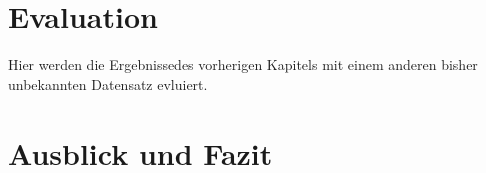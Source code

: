 \chapter{Evaluation}\label{sec:evaluation}

Hier werden die Ergebnissedes vorherigen Kapitels mit einem anderen bisher unbekannten Datensatz evluiert.



\chapter{Ausblick und Fazit}\label{sec:fazit}
